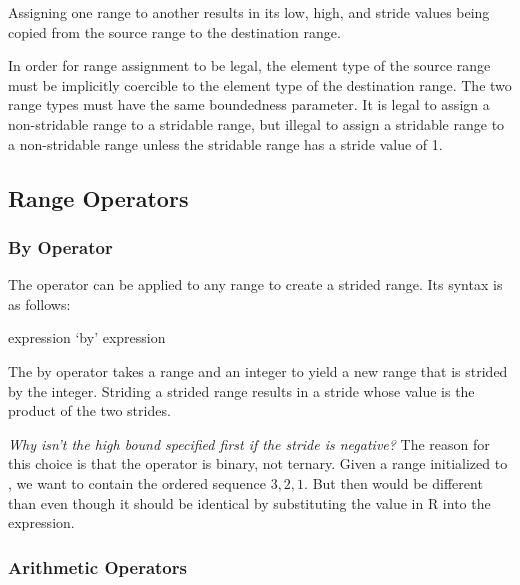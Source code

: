 Assigning one range to another results in its low, high, and stride
values being copied from the source range to the destination range.

In order for range assignment to be legal, the element type of the
source range must be implicitly coercible to the element type of the
destination range.  The two range types must have the same boundedness
parameter.  It is legal to assign a non-stridable range to a stridable
range, but illegal to assign a stridable range to a non-stridable
range unless the stridable range has a stride value of 1.


\subsection{Range Operators}
\label{Range_Operators}

\subsubsection{By Operator}
\label{Strided_Ranges}

The  operator can be applied to any range to create a strided
range.  Its syntax is as follows:

\begin{syntax}
expression `by' expression
\end{syntax}

The by operator takes a range and an integer to yield a new range that
is strided by the integer.  Striding a strided range results in a
stride whose value is the product of the two strides.

\begin{rationale}
{\it Why isn't the high bound specified first if the stride is
negative?}  The reason for this choice is that the  operator
is binary, not ternary.  Given a range  initialized
to , we want  to contain the ordered sequence
$3,2,1$.  But then  would be different than  even though it should be identical by substituting the value in
R into the expression.
\end{rationale}

\subsubsection{Arithmetic Operators}
\label{Range_Arithmetic}

